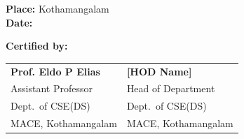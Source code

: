 \vspace{30pt}
\noindent\textbf{Place:} Kothamangalam\\
\textbf{Date:}  \underline{\hspace{3cm}}

\vspace{40pt}
\noindent\textbf{Certified by:}

\vspace{20pt}
\begin{tabular}{p{7.5cm} p{7.5cm}}
  \textbf{Prof. Eldo P Elias}           & \textbf{[HOD Name]}                \\[2pt]
  Assistant Professor                   & Head of Department                 \\[2pt]
  Dept.\ of CSE(DS)                     & Dept.\ of CSE(DS)                  \\[2pt]
  MACE, Kothamangalam                   & MACE, Kothamangalam                \\
\end{tabular}
